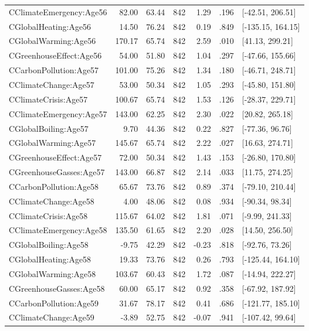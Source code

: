 \begin{table}[ht]
\begin{tabular}{lrrrrrl}
  CClimateEmergency:Age56 & 82.00 & 63.44 & 842 & 1.29 & .196 & [-42.51, 206.51] \\ 
  CGlobalHeating:Age56 & 14.50 & 76.24 & 842 & 0.19 & .849 & [-135.15, 164.15] \\ 
  CGlobalWarming:Age56 & 170.17 & 65.74 & 842 & 2.59 & .010 & [41.13, 299.21] \\ 
  CGreenhouseEffect:Age56 & 54.00 & 51.80 & 842 & 1.04 & .297 & [-47.66, 155.66] \\ 
  CCarbonPollution:Age57 & 101.00 & 75.26 & 842 & 1.34 & .180 & [-46.71, 248.71] \\ 
  CClimateChange:Age57 & 53.00 & 50.34 & 842 & 1.05 & .293 & [-45.80, 151.80] \\ 
  CClimateCrisis:Age57 & 100.67 & 65.74 & 842 & 1.53 & .126 & [-28.37, 229.71] \\ 
  CClimateEmergency:Age57 & 143.00 & 62.25 & 842 & 2.30 & .022 & [20.82, 265.18] \\ 
  CGlobalBoiling:Age57 & 9.70 & 44.36 & 842 & 0.22 & .827 & [-77.36, 96.76] \\ 
  CGlobalWarming:Age57 & 145.67 & 65.74 & 842 & 2.22 & .027 & [16.63, 274.71] \\ 
  CGreenhouseEffect:Age57 & 72.00 & 50.34 & 842 & 1.43 & .153 & [-26.80, 170.80] \\ 
  CGreenhouseGasses:Age57 & 143.00 & 66.87 & 842 & 2.14 & .033 & [11.75, 274.25] \\ 
  CCarbonPollution:Age58 & 65.67 & 73.76 & 842 & 0.89 & .374 & [-79.10, 210.44] \\ 
  CClimateChange:Age58 & 4.00 & 48.06 & 842 & 0.08 & .934 & [-90.34, 98.34] \\ 
  CClimateCrisis:Age58 & 115.67 & 64.02 & 842 & 1.81 & .071 & [-9.99, 241.33] \\ 
  CClimateEmergency:Age58 & 135.50 & 61.65 & 842 & 2.20 & .028 & [14.50, 256.50] \\ 
  CGlobalBoiling:Age58 & -9.75 & 42.29 & 842 & -0.23 & .818 & [-92.76, 73.26] \\ 
  CGlobalHeating:Age58 & 19.33 & 73.76 & 842 & 0.26 & .793 & [-125.44, 164.10] \\ 
  CGlobalWarming:Age58 & 103.67 & 60.43 & 842 & 1.72 & .087 & [-14.94, 222.27] \\ 
  CGreenhouseGasses:Age58 & 60.00 & 65.17 & 842 & 0.92 & .358 & [-67.92, 187.92] \\ 
  CCarbonPollution:Age59 & 31.67 & 78.17 & 842 & 0.41 & .686 & [-121.77, 185.10] \\ 
  CClimateChange:Age59 & -3.89 & 52.75 & 842 & -0.07 & .941 & [-107.42, 99.64] \\ 

\end{tabular}
\end{table}
